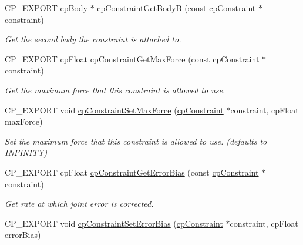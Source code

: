 \begin{DoxyCompactItemize}
\mbox{\label{group__cpConstraint_ga94f515648e3e79a74deecf6180fc1aed}} 
C\+P\+\_\+\+E\+X\+P\+O\+RT \hyperlink{structcpBody}{cp\+Body} $\ast$ \hyperlink{group__cpConstraint_ga94f515648e3e79a74deecf6180fc1aed}{cp\+Constraint\+Get\+BodyB} (const \hyperlink{structcpConstraint}{cp\+Constraint} $\ast$constraint)
\begin{DoxyCompactList}\small\item\em Get the second body the constraint is attached to. \end{DoxyCompactList}\item 
\mbox{\label{group__cpConstraint_ga2acc66455fd36f4aa202220cf7dff85b}} 
C\+P\+\_\+\+E\+X\+P\+O\+RT cp\+Float \hyperlink{group__cpConstraint_ga2acc66455fd36f4aa202220cf7dff85b}{cp\+Constraint\+Get\+Max\+Force} (const \hyperlink{structcpConstraint}{cp\+Constraint} $\ast$constraint)
\begin{DoxyCompactList}\small\item\em Get the maximum force that this constraint is allowed to use. \end{DoxyCompactList}\item 
\mbox{\label{group__cpConstraint_gafadafd0fd9fb76eeffec535ecb0a8b1e}} 
C\+P\+\_\+\+E\+X\+P\+O\+RT void \hyperlink{group__cpConstraint_gafadafd0fd9fb76eeffec535ecb0a8b1e}{cp\+Constraint\+Set\+Max\+Force} (\hyperlink{structcpConstraint}{cp\+Constraint} $\ast$constraint, cp\+Float max\+Force)
\begin{DoxyCompactList}\small\item\em Set the maximum force that this constraint is allowed to use. (defaults to I\+N\+F\+I\+N\+I\+TY) \end{DoxyCompactList}\item 
\mbox{\label{group__cpConstraint_gadffe7197ac17d8cef847e71fa74d6b2d}} 
C\+P\+\_\+\+E\+X\+P\+O\+RT cp\+Float \hyperlink{group__cpConstraint_gadffe7197ac17d8cef847e71fa74d6b2d}{cp\+Constraint\+Get\+Error\+Bias} (const \hyperlink{structcpConstraint}{cp\+Constraint} $\ast$constraint)
\begin{DoxyCompactList}\small\item\em Get rate at which joint error is corrected. \end{DoxyCompactList}\item 
C\+P\+\_\+\+E\+X\+P\+O\+RT void \hyperlink{group__cpConstraint_gacd4448af488e19721f3755f9ddaece9d}{cp\+Constraint\+Set\+Error\+Bias} (\hyperlink{structcpConstraint}{cp\+Constraint} $\ast$constraint, cp\+Float error\+Bias)

\end{DoxyCompactItemize}

